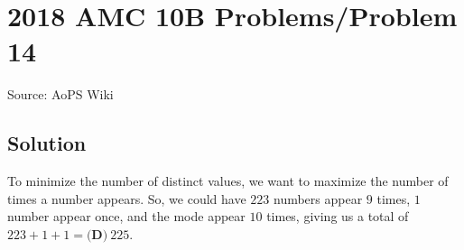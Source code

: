 \documentclass[12pt]{article}
\begin{document}
\section*{{2018 AMC 10B Problems/Problem 14}}
Source: AoPS Wiki

\subsection*{Solution}
To minimize the number of distinct values, we want to maximize the number of times a number appears. So, we could have $223$ numbers appear $9$ times, $1$ number appear once, and the mode appear $10$ times, giving us a total of $223 + 1 + 1 = \boxed{\textbf{(D)}\ 225}.$
\end{document}
